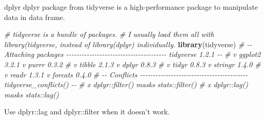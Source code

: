 \documentclass[
  10pt,
  ignorenonframetext,
  serif]{beamer}
\newenvironment{Shaded}{\begin{snugshade}}{\end{snugshade}}
\newcommand{\CommentTok}[1]{\textcolor[rgb]{0.56,0.35,0.01}{\textit{#1}}}
\newcommand{\KeywordTok}[1]{\textcolor[rgb]{0.13,0.29,0.53}{\textbf{#1}}}
\newcommand{\NormalTok}[1]{#1}
\begin{document}
\begin{frame}[fragile]{dplyr}
\protect\hypertarget{dplyr}{}
dplyr package from tidyverse is a high-performance package to manipulate
data in data frame.

\begin{Shaded}
\begin{Highlighting}[]
\CommentTok{\# tidyverse is a bundle of packages.}
\CommentTok{\# I usually load them all with library(tidyverse, instead of library(dplyr) individually.}
\KeywordTok{library}\NormalTok{(tidyverse)}
\CommentTok{\# {-}{-} Attaching packages {-}{-}{-}{-}{-}{-}{-}{-}{-}{-}{-}{-}{-}{-}{-}{-}{-}{-}{-}{-}{-}{-}{-}{-}{-}{-}{-}{-}{-}{-}{-}{-}{-}{-}{-}{-}{-}{-}{-} tidyverse 1.2.1 {-}{-}}
\CommentTok{\# v ggplot2 3.2.1     v purrr   0.3.2}
\CommentTok{\# v tibble  2.1.3     v dplyr   0.8.3}
\CommentTok{\# v tidyr   0.8.3     v stringr 1.4.0}
\CommentTok{\# v readr   1.3.1     v forcats 0.4.0}
\CommentTok{\# {-}{-} Conflicts {-}{-}{-}{-}{-}{-}{-}{-}{-}{-}{-}{-}{-}{-}{-}{-}{-}{-}{-}{-}{-}{-}{-}{-}{-}{-}{-}{-}{-}{-}{-}{-}{-}{-}{-}{-}{-}{-}{-}{-}{-}{-} tidyverse\_conflicts() {-}{-}}
\CommentTok{\# x dplyr::filter() masks stats::filter()}
\CommentTok{\# x dplyr::lag()    masks stats::lag()}
\end{Highlighting}
\end{Shaded}

Use dplyr::lag and dplyr::filter when it doesn't work.
\end{frame}
\end{document}
